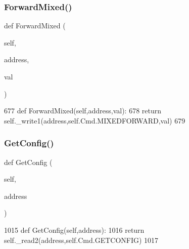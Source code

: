 \subsubsection{\texorpdfstring{Forward\+Mixed()}{ForwardMixed()}}
{\footnotesize\ttfamily def Forward\+Mixed (\begin{DoxyParamCaption}\item[{}]{self,  }\item[{}]{address,  }\item[{}]{val }\end{DoxyParamCaption})}


\begin{DoxyCode}
677     \textcolor{keyword}{def }ForwardMixed(self,address,val):
678         \textcolor{keywordflow}{return} self.\_write1(address,self.Cmd.MIXEDFORWARD,val)
679 
\end{DoxyCode}
\mbox{\label{classtoxic__hardware_1_1roboclaw__3_1_1Roboclaw_afc1b66a8f32fe623ab34d0fdfef9186c}} 
\subsubsection{\texorpdfstring{Get\+Config()}{GetConfig()}}
{\footnotesize\ttfamily def Get\+Config (\begin{DoxyParamCaption}\item[{}]{self,  }\item[{}]{address }\end{DoxyParamCaption})}


\begin{DoxyCode}
1015     \textcolor{keyword}{def }GetConfig(self,address):
1016         \textcolor{keywordflow}{return} self.\_read2(address,self.Cmd.GETCONFIG)
1017 
\end{DoxyCode}
\mbox{\label{classtoxic__hardware_1_1roboclaw__3_1_1Roboclaw_afc265149c1e2c828615710da9984db1a}} 
